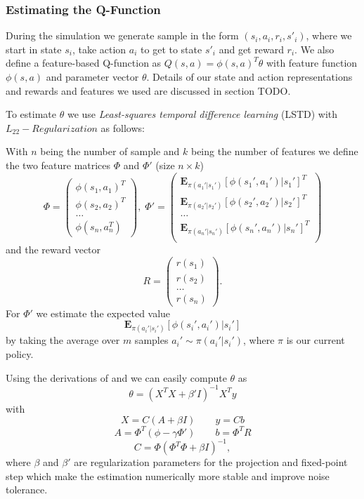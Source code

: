 \documentclass[twoside]{article}
\begin{document}
\subsubsection{Estimating the Q-Function}
During the simulation we generate sample in the form $(s_i, a_i, r_i, s'_i)$,
where we start in state $s_i$, take action $a_i$ to get to state $s'_i$ and
get reward $r_i$. We also define a feature-based Q-function as $Q(s, a) =
\phi(s,a)^T \theta$ with feature function $\phi(s,a)$ and parameter vector
$\theta$. Details of our state and action representations and rewards and
features we used are discussed in section TODO.

To estimate $\theta$ we use \emph{Least-squares temporal difference
learning} (LSTD) with $L_{22}-Regularization$\cite{lstdRegularization} as
follows:

With $n$ being the number of sample and $k$ being the number of features
we define the two feature matrices $\Phi$ and $\Phi'$ (size $n\times k$)
$$
\Phi = \left(
\begin{array}{c}
    \phi(s_1,a_1)^T \\
    \phi(s_2,a_2)^T \\
    \dots \\
    \phi(s_n,a_n^T)
\end{array} \right), \;
\Phi' = \left(
\begin{array}{c}
    \mathbf{E}_{\pi(a_1'|s_1')} [\phi(s_1', a_1') | s_1']^T \\
    \mathbf{E}_{\pi(a_2'|s_2')} [\phi(s_2', a_2') | s_2']^T \\
    \dots \\
    \mathbf{E}_{\pi(a_n'|s_n')} [\phi(s_n', a_n') | s_n']^T \\
\end{array} \right)
$$
and the reward vector
$$
R = \left(
\begin{array}{c}
    r(s_1) \\
    r(s_2) \\
    \dots \\
    r(s_n)
\end{array} \right).
$$
For $\Phi'$ we estimate the expected value
$$
\mathbf{E}_{\pi(a_i'|s_i')} [\phi(s_i', a_i') | s_i']
$$
by taking the average over $m$ samples $a_i' \sim \pi(a_i'|s_i')$, where $\pi$
is our current policy.

Using the derivations of \cite{lspi} and \cite{lstdRegularization} we can easily
compute $\theta$ as
$$
\theta = (X^TX+\beta'I)^{-1}X^Ty
$$
with
$$X = C(A+\beta I) \qquad y=Cb$$
$$A = \Phi^T(\phi-\gamma \Phi') \qquad b=\Phi^T R$$
$$C = \Phi(\Phi^T\Phi+\beta I)^{-1},$$
where $\beta$ and $\beta'$ are regularization parameters for the projection and
fixed-point step which make the estimation numerically more stable and improve
noise tolerance.
\end{document}

